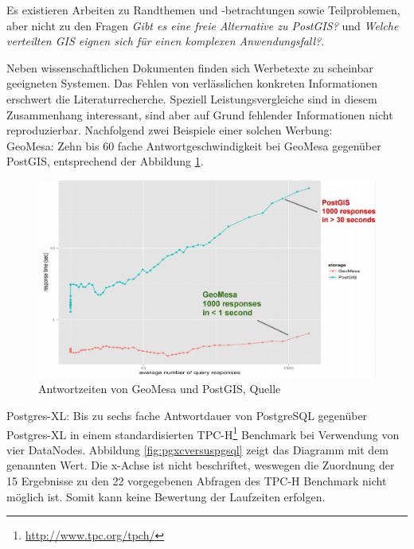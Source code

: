 Es existieren Arbeiten zu Randthemen und -betrachtungen sowie Teilproblemen, aber nicht zu den Fragen \textit{Gibt es eine freie Alternative zu PostGIS?} und \textit{Welche verteilten GIS eignen sich für einen komplexen Anwendungsfall?}.

Neben wissenschaftlichen Dokumenten finden sich Werbetexte zu scheinbar geeigneten Systemen.
Das Fehlen von verlässlichen konkreten Informationen erschwert die Literaturrecherche.
Speziell Leistungsvergleiche sind in diesem Zusammenhang interessant, sind aber auf Grund fehlender Informationen nicht reproduzierbar.
Nachfolgend zwei Beispiele einer solchen Werbung:\\
GeoMesa: Zehn bis 60 fache Antwortgeschwindigkeit bei GeoMesa gegenüber PostGIS, entsprechend der Abbildung \ref{fig:geomesaversuspostgis}.
\begin{figure}[h!]
\centering
\includegraphics[width=.8\textwidth]{Abbildungen/geomesa_versus_postgis.png}
\caption[Antwortzeiten von GeoMesa und PostGIS]{Antwortzeiten von GeoMesa und PostGIS, Quelle \cite[S.24]{website:slideshare:geomesa}}
\label{fig:geomesaversuspostgis}
\end{figure}
\newpage
Postgres-XL: Bis zu sechs fache Antwortdauer von PostgreSQL gegenüber Postgres-XL in einem standardisierten TPC-H\footnote{\url{http://www.tpc.org/tpch/}} Benchmark bei Verwendung von vier DataNodes. Abbildung \ref{fig:pgxcversuspgsql} zeigt das Diagramm mit dem genannten Wert.
Die x-Achse ist nicht beschriftet, weswegen die Zuordnung der 15 Ergebnisse zu den 22 vorgegebenen Abfragen des TPC-H Benchmark nicht möglich ist.
Somit kann keine Bewertung der Laufzeiten erfolgen.
